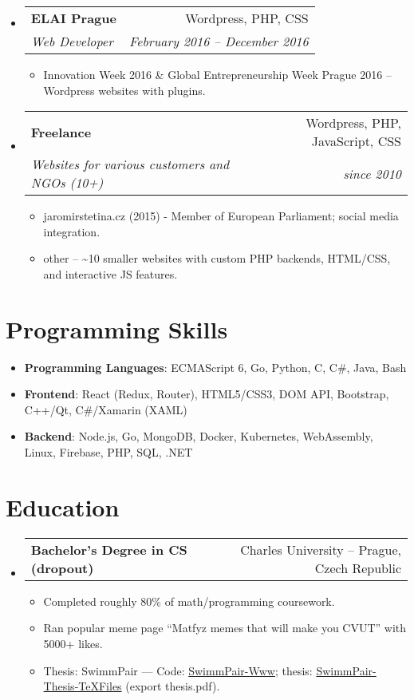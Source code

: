 \documentclass[letterpaper,11pt]{article}
\makeatletter
\newcommand{\sitem}[1]{\item #1 \vspace{-2pt}}
\newcommand{\resumeSubheading}[4]{
  \vspace{-1pt}\item
    \begin{tabular*}{0.97\textwidth}[t]{l@{\extracolsep{\fill}}r}
      \textbf{#1} & #2 \\
      \textit{\small#3} & \textit{\small #4} \\
    \end{tabular*}\vspace{-5pt}
}
\newcommand{\resumeSubheadingg}[2]{
  \vspace{-1pt}\item
    \begin{tabular*}{0.97\textwidth}[t]{l@{\extracolsep{\fill}}r}
      \textbf{#1} & #2
    \end{tabular*}\vspace{-5pt}
}
\newenvironment{subheadingListing}{\begin{itemize}[leftmargin=*]}{\end{itemize}}
\newenvironment{resumeList}{\begin{itemize}}{\end{itemize}\vspace{-5pt}}
\newcommand{\CC}{C\nolinebreak\hspace{-.05em}\raisebox{.4ex}{\tiny\bf +}\nolinebreak\hspace{-.10em}\raisebox{.4ex}{\tiny\bf +}}
\makeatother
\begin{document}
\begin{subheadingListing}
  \resumeSubheading
  {ELAI Prague}{Wordpress, PHP, CSS}
  {Web Developer}{February 2016 – December 2016}
  \begin{resumeList}
\sitem{Innovation Week 2016 \& Global Entrepreneurship Week Prague 2016 – Wordpress websites with plugins.}
 \end{resumeList}

  \resumeSubheading
  {Freelance}{Wordpress, PHP, JavaScript, CSS}
  {Websites for various customers and NGOs (10+)}{since 2010}
  \begin{resumeList}
    \sitem{jaromirstetina.cz (2015) - Member of European Parliament; social media integration.}
    \sitem{other – \textasciitilde 10 smaller websites with custom PHP backends, HTML/CSS, and interactive JS features.}

  \end{resumeList}

\end{subheadingListing}


\section{Programming Skills}
\begin{subheadingListing}
  \sitem{
    \textbf{Programming Languages}{: ECMAScript 6, Go, Python, \CC, C\#, Java, Bash}
  }
  \sitem{
    \textbf{Frontend}{: React (Redux, Router), HTML5/CSS3, DOM API, Bootstrap, C++/Qt, C\#/Xamarin (XAML)}
  }
  \sitem{
    \textbf{Backend}{: Node.js, Go, MongoDB, Docker, Kubernetes, WebAssembly, Linux, Firebase, PHP, SQL, .NET}
  }
\end{subheadingListing}


\section{Education}
\begin{subheadingListing}

  \resumeSubheadingg
  {Bachelor's Degree in CS (dropout)}{Charles University – Prague, Czech Republic}

  \begin{resumeList}
    \sitem{Completed roughly 80\% of math/programming coursework.}
    \sitem{Ran popular meme page “Matfyz memes that will make you CVUT” with 5000+ likes.}
    \sitem{Thesis: SwimmPair --- Code: \href{https://github.com/KlosStepan/SwimmPair-Www}{SwimmPair-Www}; thesis: \href{https://github.com/KlosStepan/SwimmPair-Thesis-TeXFiles}{SwimmPair-Thesis-TeXFiles} (export thesis.pdf).}
  \end{resumeList}
\end{subheadingListing}
\end{document}
